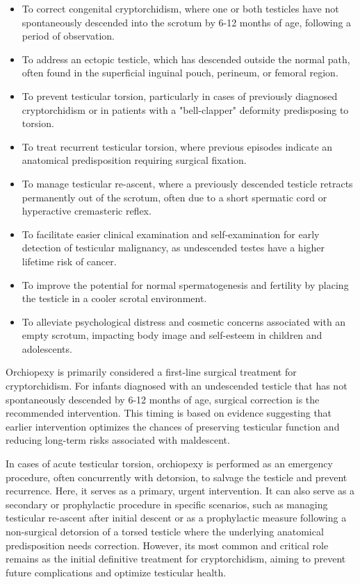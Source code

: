 \begin{itemize}
  \item To correct congenital cryptorchidism, where one or both testicles have not spontaneously descended into the scrotum by 6-12 months of age, following a period of observation.
  \item To address an ectopic testicle, which has descended outside the normal path, often found in the superficial inguinal pouch, perineum, or femoral region.
  \item To prevent testicular torsion, particularly in cases of previously diagnosed cryptorchidism or in patients with a "bell-clapper" deformity predisposing to torsion.
  \item To treat recurrent testicular torsion, where previous episodes indicate an anatomical predisposition requiring surgical fixation.
  \item To manage testicular re-ascent, where a previously descended testicle retracts permanently out of the scrotum, often due to a short spermatic cord or hyperactive cremasteric reflex.
  \item To facilitate easier clinical examination and self-examination for early detection of testicular malignancy, as undescended testes have a higher lifetime risk of cancer.
  \item To improve the potential for normal spermatogenesis and fertility by placing the testicle in a cooler scrotal environment.
  \item To alleviate psychological distress and cosmetic concerns associated with an empty scrotum, impacting body image and self-esteem in children and adolescents.
\end{itemize}

Orchiopexy is primarily considered a first-line surgical treatment for cryptorchidism. For infants diagnosed with an undescended testicle that has not spontaneously descended by 6-12 months of age, surgical correction is the recommended intervention. This timing is based on evidence suggesting that earlier intervention optimizes the chances of preserving testicular function and reducing long-term risks associated with maldescent.

In cases of acute testicular torsion, orchiopexy is performed as an emergency procedure, often concurrently with detorsion, to salvage the testicle and prevent recurrence. Here, it serves as a primary, urgent intervention. It can also serve as a secondary or prophylactic procedure in specific scenarios, such as managing testicular re-ascent after initial descent or as a prophylactic measure following a non-surgical detorsion of a torsed testicle where the underlying anatomical predisposition needs correction. However, its most common and critical role remains as the initial definitive treatment for cryptorchidism, aiming to prevent future complications and optimize testicular health.

